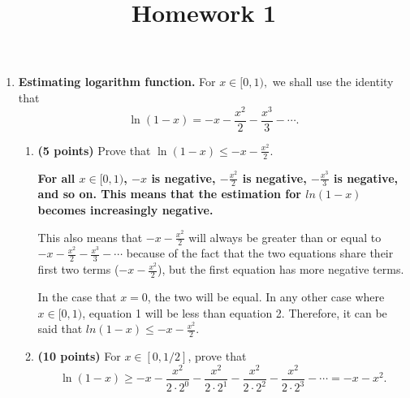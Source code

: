 \documentclass[11pt]{article}
\begin{document}
\title{Homework 1}

\date{}

\maketitle 

\thispagestyle{fancy}  
\pagestyle{fancy}      




\begin{enumerate}
\item {\bfseries Estimating logarithm function.} For $x\in[0,1),$ we shall use the identity that 
  $$\ln(1-x) = -x - \frac{x^2}2 - \frac{x^3}3 - \dotsi.$$
\begin{enumerate} 
    \item {\bfseries (5 points)} Prove that $\ln(1-x) \leq - x - \frac{x^2}2.$
    \newline
    {\bfseries
      \newline
      \newline
      For all $x\in[0,1)$, $-x$ is negative, $ -\frac{x^2}2$ is negative, $ -\frac{x^3}3$ is negative, and so on. This means that the estimation for $ln(1-x)$ becomes increasingly negative. \newline

      This also means that $-x -\frac{x^2}2$ will always be greater than or equal to $-x -\frac{x^2}2 -\frac{x^3}3 -\dotsi$ because of the fact that the two equations share their first two terms ($-x -\frac{x^2}2$), but the first equation has more negative terms. \newline
      \newline

      In the case that $x=0$, the two will be equal. In any other case where $x\in[0,1)$, equation 1 will be less than equation 2. Therefore, it can be said that $ln(1-x) \leq -x -\frac{x^2}2$.
    }
    \newpage
    
    \item {\bfseries (10 points)} For $x\in[0,1/2]$, prove that 
      $$\ln(1-x) \geq -x - \frac{x^2}{2\cdot 2^0} - \frac{x^2}{2\cdot 2^1} -\frac{x^2}{2\cdot 2^2} - \frac{x^2}{2\cdot 2^3} - \dotsi = -x-x^2.$$
  \newline
    {\bfseries
      \newline
      \newline

}
\end{enumerate}
\end{enumerate}
\end{document}
